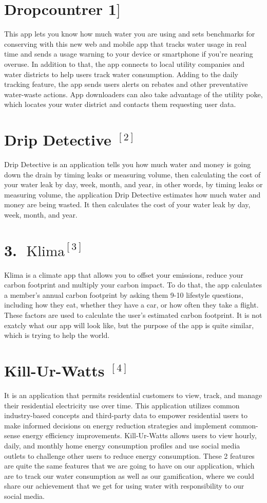 \documentclass[10pt]{article}
\begin{document}
\section{Dropcountrer 1$]$}
This app lets you know how much water you are using and sets benchmarks for conserving with this new web and mobile app that tracks water usage in real time and sends a usage warning to your device or smartphone if you're nearing overuse. In addition to that, the app connects to local utility companies and water districts to help users track water consumption. Adding to the daily tracking feature, the app sends users alerts on rebates and other preventative water-waste actions. App downloaders can also take advantage of the utility poke, which locates your water district and contacts them requesting user data.

\section{Drip Detective ${ }^{[2]}$}
Drip Detective is an application tells you how much water and money is going down the drain by timing leaks or measuring volume, then calculating the cost of your water leak by day, week, month, and year, in other words, by timing leaks or measuring volume, the application Drip Detective estimates how much water and money are being wasted. It then calculates the cost of your water leak by day, week, month, and year.

\section{3. $\operatorname{Klima}^{[3]}$}
Klima is a climate app that allows you to offset your emissions, reduce your carbon footprint and multiply your carbon impact. To do that, the app calculates a member's annual carbon footprint by asking them 9-10 lifestyle questions, including how they eat, whether they have a car, or how often they take a flight. These factors are used to calculate the user's estimated carbon footprint. It is not exatcly what our app will look like, but the purpose of the app is quite similar, which is trying to help the world.

\section{Kill-Ur-Watts ${ }^{[4]}$}
It is an application that permits residential customers to view, track, and manage their residential electricity use over time. This application utilizes common industry-based concepts and third-party data to empower residential users to make informed decisions on energy reduction strategies and implement common-sense energy efficiency improvements. Kill-Ur-Watts allows users to view hourly, daily, and monthly home energy consumption profiles and use social media outlets to challenge other users to reduce energy consumption. These 2 features are quite the same features that we are going to have on our application, which are to track our water consumption as well as our gamification, where we could share our achievement that we get for using water with responsibility to our social media.
\end{document}
